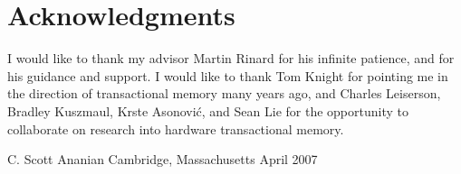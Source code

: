 \clearpage
\section*{Acknowledgments}

I would like to thank my advisor Martin Rinard for his infinite
patience, and for his guidance and support.  I would like to thank Tom
Knight for pointing me in the direction of transactional memory many
years ago, and Charles Leiserson, Bradley Kuszmaul, Krste Asonovi\'c,
and Sean Lie for the opportunity to collaborate on research into
hardware transactional memory.


\begin{flushright}
C. Scott Ananian\tight
Cambridge, Massachusetts\tight
April 2007
\end{flushright}
